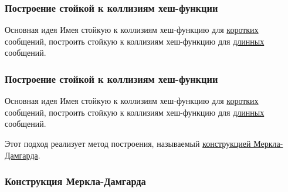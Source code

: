 \documentclass{beamer}
\begin{document}

\begin{frame}
  \frametitle{Построение стойкой к коллизиям хеш-функции}

  \begin{block}{Основная идея}
  Имея стойкую к коллизиям хеш-функцию для \underline{коротких}
  сообщений, построить стойкую к коллизиям хеш-функцию для \underline{длинных}
  сообщений.
  \end{block}
\end{frame}

\begin{frame}
  \frametitle{Построение стойкой к коллизиям хеш-функции}

  \begin{block}{Основная идея}
  Имея стойкую к коллизиям хеш-функцию для \underline{коротких}
  сообщений, построить стойкую к коллизиям хеш-функцию для \underline{длинных}
  сообщений.
  \end{block}

  \vspace{8mm}
  Этот подход реализует метод построения, называемый \underline{конструкцией Меркла-Дамгарда}.
\end{frame}

\begin{frame}
  \frametitle{Конструкция Меркла-Дамгарда}

\end{frame}
\end{document}
